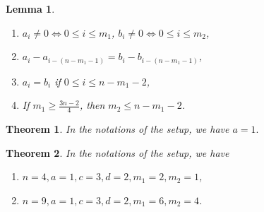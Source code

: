 \documentclass[10pt,a4paper]{amsart}
\newtheorem{lemma}{Lemma}
\newtheorem{theorem}{Theorem}
\begin{document}
\begin{lemma}\label{lemma:betti}
    \begin{enumerate}
        \item [(i)] $a_i\neq 0 \Longleftrightarrow 0\leq i\leq m_1$, $b_i\neq 0 \Longleftrightarrow 0\leq i\leq m_2$,
        \item[(ii)] $a_i-a_{i-(n-m_1-1)}=b_i-b_{i-(n-m_1-1)}$,
        \item[(iii)] $a_i=b_i$ if $0\leq i\leq n-m_1-2$,
        \item[(iv)] If $m_1\geq \frac{3n-2}{4}$, then $m_2\leq n-m_1-2$. 
    \end{enumerate}
\end{lemma}

\begin{theorem}\label{theorem:a=1}
In the notations of the setup, we have $a=1.$
\end{theorem}

\begin{theorem}\label{theorem:2case}
In the notations of the setup, we have
    \begin{enumerate}
        \item [either (1)] $n=4, a=1, c=3, d=2, m_1=2, m_2=1$,
     \item [or (2)] $n=9, a=1, c=3, d=2, m_1=6, m_2=4$.
    \end{enumerate}
\end{theorem}
\end{document}
